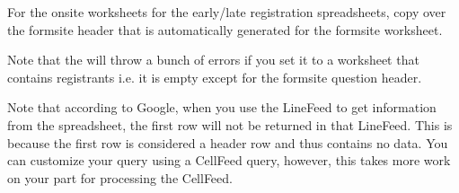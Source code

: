\documentclass[12pt,final]{article}
\begin{document}

For the onsite worksheets for the early/late registration spreadsheets, copy
over the formsite header that is automatically generated for the formsite
worksheet.

Note that the  will throw a bunch of errors if you set
it to a worksheet that contains  registrants i.e. it is empty except for
the formsite question header.

Note that according to Google, when you use the LineFeed to get information
from the spreadsheet, the first row will not be returned in that LineFeed.
This is because the first row is considered a header row and thus
contains no data. You can customize your query using a CellFeed query,
however, this takes more work on your part for processing the CellFeed.
\end{document}
